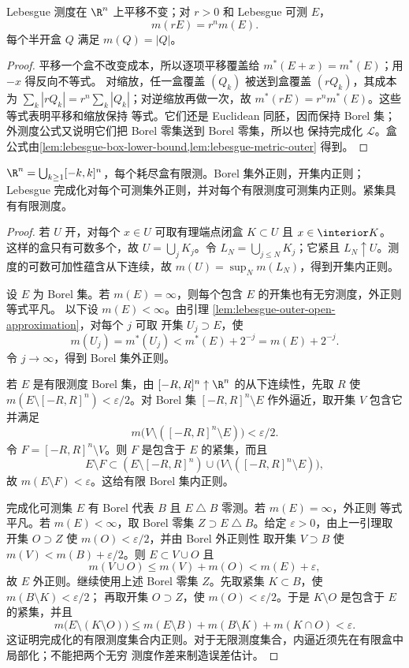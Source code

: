 \begin{theorem}\label{theorem:2-1-3-1}
Lebesgue 测度在 $\R^n$ 上平移不变；对 $r>0$ 和 Lebesgue 可测 $E$，
\[
 m(rE)=r^n m(E).
\]
每个半开盒 $Q$ 满足 $m(Q)=|Q|$。
\end{theorem}

\begin{proof}
平移一个盒不改变成本，所以逐项平移覆盖给 $m^*(E+x)=m^*(E)$；用 $-x$ 得反向不等式。
对缩放，任一盒覆盖 $(Q_k)$ 被送到盒覆盖 $(rQ_k)$，其成本为
$\sum_k|rQ_k|=r^n\sum_k|Q_k|$；对逆缩放再做一次，故
$m^*(rE)=r^nm^*(E)$。这些等式表明平移和缩放保持 \Caratheodory{} 等式。它们还是
Euclidean 同胚，因而保持 Borel 集；外测度公式又说明它们把 Borel 零集送到 Borel 零集，所以也
保持完成化 $\mathcal L$。盒公式由\cref{lem:lebesgue-box-lower-bound,lem:lebesgue-metric-outer}
得到。
\end{proof}

\begin{theorem}\label{theorem:2-1-3-2}
$\R^n=\bigcup_{k\ge1}[-k,k]^n$，每个耗尽盒有限测。Borel 集外正则，开集内正则；Lebesgue
完成化对每个可测集外正则，并对每个有限测度可测集内正则。紧集具有有限测度。
\end{theorem}

\begin{proof}
若 $U$ 开，对每个 $x\in U$ 可取有理端点闭盒 $K\subset U$ 且 $x\in\interior K$。
这样的盒只有可数多个，故 $U=\bigcup_jK_j$。令 $L_N=\bigcup_{j\le N}K_j$；它紧且
$L_N\uparrow U$。测度的可数可加性蕴含从下连续，故
$m(U)=\sup_Nm(L_N)$，得到开集内正则。

设 $E$ 为 Borel 集。若 $m(E)=\infty$，则每个包含 $E$ 的开集也有无穷测度，外正则等式平凡。
以下设 $m(E)<\infty$。由引理 \ref{lem:lebesgue-outer-open-approximation}，对每个 $j$ 可取
开集 $U_j\supset E$，使
\[
 m(U_j)=m^*(U_j)<m^*(E)+2^{-j}=m(E)+2^{-j}.
\]
令 $j\to\infty$，得到 Borel 集外正则。

若 $E$ 是有限测度 Borel 集，由 $[-R,R]^n\uparrow\R^n$ 的从下连续性，先取 $R$ 使
$m(E\setminus[-R,R]^n)<\varepsilon/2$。对 Borel 集 $[-R,R]^n\setminus E$ 作外逼近，取开集
$V$ 包含它并满足
\[
 m\bigl(V\setminus([-R,R]^n\setminus E)\bigr)<\varepsilon/2.
\]
令 $F=[-R,R]^n\setminus V$。则 $F$ 是包含于 $E$ 的紧集，而且
\[
 E\setminus F
 \subset (E\setminus[-R,R]^n)
 \cup\bigl(V\setminus([-R,R]^n\setminus E)\bigr),
\]
故 $m(E\setminus F)<\varepsilon$。这给有限 Borel 集内正则。

完成化可测集 $E$ 有 Borel 代表 $B$ 且 $E\mathbin\triangle B$ 零测。若 $m(E)=\infty$，外正则
等式平凡。若 $m(E)<\infty$，取 Borel 零集 $Z\supset E\mathbin\triangle B$。给定
$\varepsilon>0$，由上一引理取开集 $O\supset Z$ 使 $m(O)<\varepsilon/2$，并由 Borel 外正则性
取开集 $V\supset B$ 使 $m(V)<m(B)+\varepsilon/2$。则 $E\subset V\cup O$ 且
\[
 m(V\cup O)\le m(V)+m(O)<m(E)+\varepsilon,
\]
故 $E$ 外正则。继续使用上述 Borel 零集 $Z$。先取紧集 $K\subset B$，使
$m(B\setminus K)<\varepsilon/2$；
再取开集 $O\supset Z$，使 $m(O)<\varepsilon/2$。于是 $K\setminus O$ 是包含于 $E$ 的紧集，并且
\[
 m\bigl(E\setminus(K\setminus O)\bigr)
 \le m(E\setminus B)+m(B\setminus K)+m(K\cap O)<\varepsilon.
\]
这证明完成化的有限测度集合内正则。对于无限测度集合，内逼近须先在有限盒中局部化；不能把两个无穷
测度作差来制造误差估计。
\end{proof}

